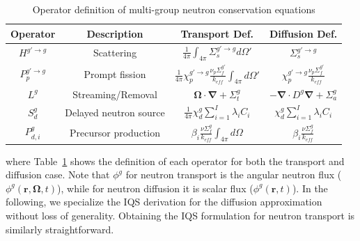 \documentclass{elsarticle}
\renewcommand{\vec}[1]{\bm{#1}} %
\newcommand{\bs}[1]{\mathbf{#1}}
\renewcommand{\div}{\bs{\nabla}\! \cdot \!}
\newcommand{\grad}{\bs{\nabla}}
\newcommand{\tbl}[1]{Table~\ref{#1}}                     %
\begin{document}
\begin{table}[htbp!]
\centering
\caption{Operator definition of multi-group neutron conservation equations}
\label{tab:op_def}
\begin{tabular}{|c|c|c|c|}
\hline
Operator & Description & Transport Def. & Diffusion Def. \\
\hline
$H^{g'\to g}$ & Scattering & $\frac{1}{4\pi}\int_{4\pi}\Sigma_s^{g'\rightarrow g}d\Omega '$ & $\Sigma_s^{g'\rightarrow g}$ \\
\hline
$P_p^{g'\to g}$ & Prompt fission & $\frac{1}{4\pi}\chi_p^{g'\rightarrow g}\frac{\nu_p\Sigma_f^{g'}}{k_{eff}}\int_{4\pi}d\Omega '$ & $\chi_p^{g'\rightarrow g}\frac{\nu_p\Sigma_f^{g'}}{k_{eff}}$ \\
\hline
$L^g$ & Streaming/Removal & $\vec \Omega \cdot \grad + \Sigma_t^g$ & $-\div D^g \grad + \Sigma_a^g$ \\
\hline
$S_d^g$ & Delayed neutron source & $\frac{1}{4\pi}\chi_d^g\sum_{i=1}^I\lambda_iC_i$ & $\chi_d^g\sum_{i=1}^I\lambda_iC_i$ \\
\hline
$P_{d,i}^g$ & Precursor production & $\beta_i\frac{\nu\Sigma_f^{g}}{k_{eff}}\int_{4\pi}d\Omega$ & $\beta_i\frac{\nu\Sigma_f^{g}}{k_{eff}}$ \\
\hline
\end{tabular}
\end{table}

where \tbl{tab:op_def} shows the definition of each operator for both the transport and diffusion case. Note that $\phi^g$ for neutron transport is the angular neutron flux ($\phi^g(\vec r, \vec\Omega, t)$), while for neutron diffusion it is scalar flux ($\phi^g(\vec r, t)$).  
In the following, we specialize the 
IQS derivation for the diffusion approximation without loss of generality. Obtaining the IQS formulation for neutron transport is similarly straightforward.
\end{document}
